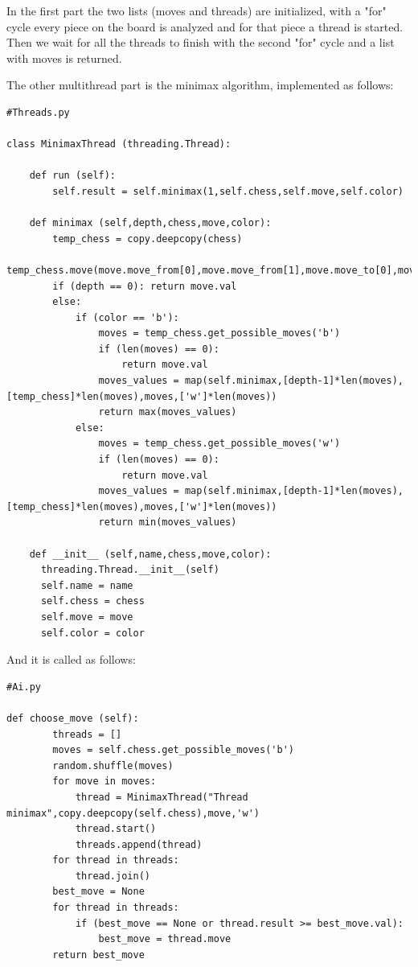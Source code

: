 \documentclass[english]{article}
\begin{document}
In the first part the two lists (moves and threads) are initialized, with a "for" cycle every piece on the board is analyzed and for that piece a thread is started.
Then we wait for all the threads to finish with the second "for" cycle and a list with moves is returned.

The other multithread part is the minimax algorithm, implemented as follows:

\begin{lstlisting}
#Threads.py

class MinimaxThread (threading.Thread):

    def run (self):
        self.result = self.minimax(1,self.chess,self.move,self.color)

    def minimax (self,depth,chess,move,color):
        temp_chess = copy.deepcopy(chess)
        temp_chess.move(move.move_from[0],move.move_from[1],move.move_to[0],move.move_to[1])
        if (depth == 0): return move.val
        else:
            if (color == 'b'):
                moves = temp_chess.get_possible_moves('b')
                if (len(moves) == 0):
                    return move.val
                moves_values = map(self.minimax,[depth-1]*len(moves),[temp_chess]*len(moves),moves,['w']*len(moves))
                return max(moves_values)
            else:
                moves = temp_chess.get_possible_moves('w')
                if (len(moves) == 0):
                    return move.val
                moves_values = map(self.minimax,[depth-1]*len(moves),[temp_chess]*len(moves),moves,['w']*len(moves))
                return min(moves_values)

    def __init__ (self,name,chess,move,color):
      threading.Thread.__init__(self)
      self.name = name
      self.chess = chess
      self.move = move
      self.color = color
\end{lstlisting}

And it is called as follows:

\begin{lstlisting}
#Ai.py

def choose_move (self):
        threads = []
        moves = self.chess.get_possible_moves('b')
        random.shuffle(moves)
        for move in moves:
            thread = MinimaxThread("Thread minimax",copy.deepcopy(self.chess),move,'w')
            thread.start()
            threads.append(thread)
        for thread in threads:
            thread.join()
        best_move = None
        for thread in threads:
            if (best_move == None or thread.result >= best_move.val):
                best_move = thread.move
        return best_move
\end{lstlisting}
\end{document}
